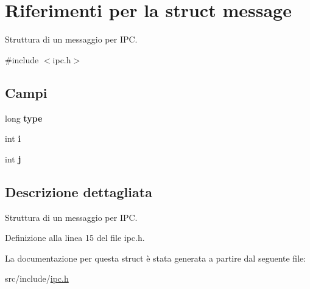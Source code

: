 \hypertarget{structmessage}{}\section{Riferimenti per la struct message}
\label{structmessage}


Struttura di un messaggio per I\+PC.  




{\ttfamily \#include $<$ipc.\+h$>$}

\subsection*{Campi}
\begin{DoxyCompactItemize}
\item 
\mbox{\label{structmessage_a1cdab6b2ccaa58f6554778dc58bca8cd}} 
long {\bfseries type}
\item 
\mbox{\label{structmessage_acc12b1ce17d5b271aa2beb81238ed395}} 
int {\bfseries i}
\item 
\mbox{\label{structmessage_acb62a617e8a3e6eac81ee2de85b91964}} 
int {\bfseries j}
\end{DoxyCompactItemize}


\subsection{Descrizione dettagliata}
Struttura di un messaggio per I\+PC. 

Definizione alla linea 15 del file ipc.\+h.



La documentazione per questa struct è stata generata a partire dal seguente file\+:\begin{DoxyCompactItemize}
\item 
src/include/\hyperlink{ipc_8h}{ipc.\+h}\end{DoxyCompactItemize}
